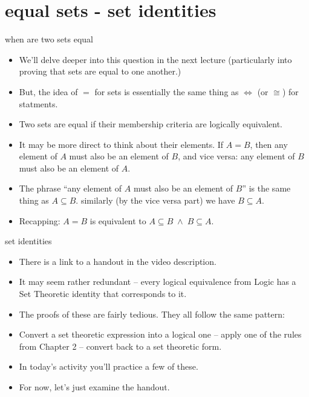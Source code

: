 \documentclass[handout,landscape]{beamer}
\begin{document}
\section{equal sets - set identities}

\begin{frame}{when are two sets equal}
\begin{itemize}
\item We'll delve deeper into this question in the next lecture (particularly into proving that sets are equal to one another.) \pause
\item But, the idea of $=$ for sets is essentially the same thing as $\iff$ \newline (or $\cong$) for statments. \pause
\item Two sets are equal if their membership criteria are logically equivalent. \pause
\item It may be more direct to think about their elements.  If $A=B$, then any element of $A$ must also be an element of $B$, and vice versa: any element of $B$ must also be an element of $A$. \pause 
\item The phrase ``any element of $A$ must also be an element of $B$'' is the same thing as $A \subseteq B$. \pause \newline
similarly (by the vice versa part) we have $B \subseteq A$. \pause
\item Recapping: \pause $A = B$ is equivalent to $A \subseteq B \; \land \; B \subseteq A$.
\end{itemize}
\end{frame}

\begin{frame}{set identities}
\begin{itemize}
\item There is a link to a handout in the video description. \pause
\item It may seem rather redundant -- every logical equivalence from Logic has a Set Theoretic identity that corresponds to it. \pause
\item The proofs of these are fairly tedious.  They all follow the same pattern: \pause 
\item Convert a set theoretic expression into a logical one -- apply one of the rules from Chapter 2 -- convert back to a set theoretic form. \pause
\item In today's activity you'll practice a few of these. \pause
\item For now, let's just examine the handout.

\end{itemize}
\end{frame}
\end{document}
